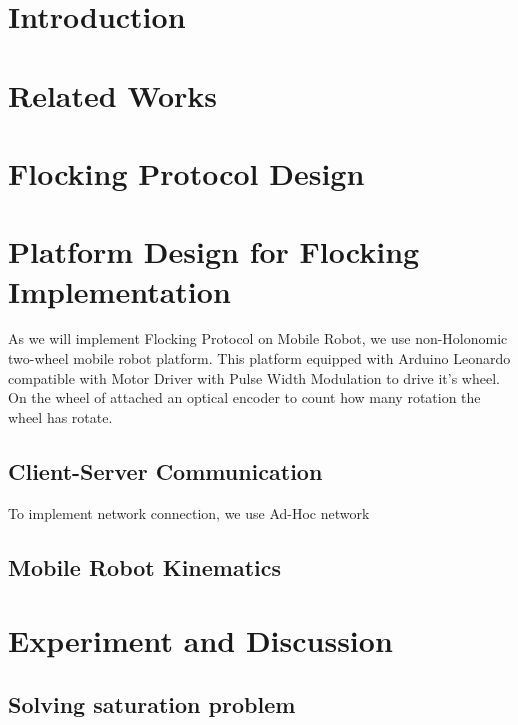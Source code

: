 \documentclass[journal]{IEEEtran}
\begin{document}
					      \section{Introduction}

					      \section{Related Works}

					      \section{Flocking Protocol Design}

					      \section{Platform Design for Flocking Implementation}
					      As we will implement Flocking Protocol on Mobile Robot, we use non-Holonomic two-wheel mobile robot platform. This platform equipped with Arduino Leonardo compatible with Motor Driver with Pulse Width Modulation to drive it's wheel. On the wheel of attached an optical encoder to count how many rotation the wheel has rotate. 

					      \subsection{Client-Server Communication}
					      To implement network connection, we use Ad-Hoc network
					      \subsection{Mobile Robot Kinematics}

					      \section{Experiment and Discussion}
					      \subsection{Solving saturation problem}
\end{document}
